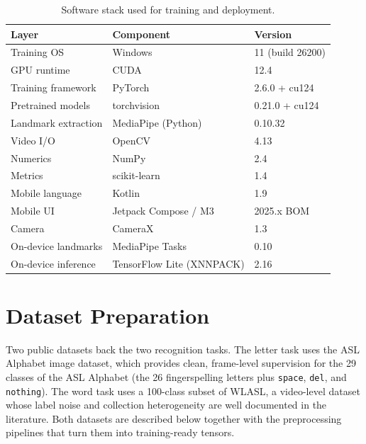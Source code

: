 \begin{table}[!ht]
\centering
\caption{Software stack used for training and deployment.}
\label{tab:impl-environment}
\begin{tabular}{lll}
\toprule
\textbf{Layer} & \textbf{Component} & \textbf{Version} \\
\midrule
Training OS         & Windows                 & 11 (build 26200) \\
GPU runtime         & CUDA                    & 12.4 \\
Training framework  & PyTorch                 & 2.6.0 + cu124 \\
Pretrained models   & torchvision             & 0.21.0 + cu124 \\
Landmark extraction & MediaPipe (Python)      & 0.10.32 \\
Video I/O           & OpenCV                  & 4.13 \\
Numerics            & NumPy                   & 2.4 \\
Metrics             & scikit-learn            & 1.4 \\
\midrule
Mobile language     & Kotlin                  & 1.9 \\
Mobile UI           & Jetpack Compose / M3    & 2025.x BOM \\
Camera              & CameraX                 & 1.3 \\
On-device landmarks & MediaPipe Tasks         & 0.10 \\
On-device inference & TensorFlow Lite (XNNPACK) & 2.16 \\
\bottomrule
\end{tabular}
\end{table}

\section{Dataset Preparation}
\label{sec:impl-data}

Two public datasets back the two recognition tasks. The letter task
uses the ASL Alphabet image dataset, which provides clean, frame-level
supervision for the 29 classes of the ASL Alphabet (the 26
fingerspelling letters plus \texttt{space}, \texttt{del}, and
\texttt{nothing}). The word task uses a 100-class subset of WLASL, a
video-level dataset whose label noise and collection heterogeneity are
well documented in the literature. Both datasets are described below
together with the preprocessing pipelines that turn them into
training-ready tensors.

